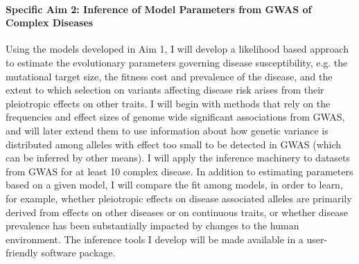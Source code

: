 \documentclass[11pt]{article}
\begin{document}
\paragraph{Specific Aim 2: Inference of Model Parameters from GWAS of Complex Diseases} Using the models developed in Aim 1, I will develop a likelihood based approach to estimate the evolutionary parameters governing disease susceptibility, e.g. the mutational target size, the fitness cost and prevalence of the disease, and the extent to which selection on variants affecting disease risk arises from their pleiotropic effects on other traits. I will begin with methods that rely on the frequencies and effect sizes of genome wide significant associations from GWAS, and will later extend them to use information about how genetic variance is distributed among alleles with effect too small to be detected in GWAS (which can be inferred by other means). I will apply the inference machinery to datasets from GWAS for at least 10 complex disease. In addition to estimating parameters based on a given model, I will compare the fit among models, in order to learn, for example, whether pleiotropic effects on disease associated alleles are primarily derived from effects on other diseases or on continuous traits, or whether disease prevalence has been substantially impacted by changes to the human environment. The inference tools I develop will be made available in a user-friendly software package.


\end{document}
